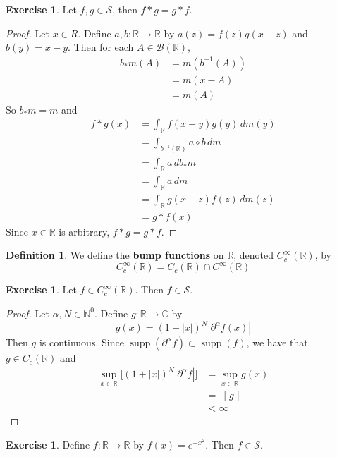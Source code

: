 \documentclass[12pt]{amsart}
\theoremstyle{definition}
\newtheorem{defn}[definition]{Definition}
\newtheorem{ex}[definition]{Exercise}
\DeclareMathOperator{\supp}{supp}
\newcommand{\p}{\partial}
\newcommand{\al}{\alpha}
\newcommand{\C}{\mathbb{C}}
\newcommand{\N}{\mathbb{N}}
\newcommand{\R}{\mathbb{R}}
\newcommand{\MB}{\mathcal{B}}
\newcommand{\MS}{\mathcal{S}}
\newcommand{\dm}{\, d m}
\begin{document}
	\begin{ex}
		Let $f, g \in \MS$, then $f*g = g*f$.
	\end{ex}

	\begin{proof}
		Let $x \in R$. Define $a,b:\R \rightarrow \R$ by $a(z) = f(z)g(x-z)$ and $b(y) = x-y$. Then for each $A \in \MB(\R)$, 
		\begin{align*}
			b_*m(A)
			& = m(b^{-1}(A)) \\
			& = m(x - A) \\
			& = m(A)
		\end{align*}
		So $b_*m = m$ and  
		\begin{align*}
			f*g(x)
			& = \int_{\R} f(x-y)g(y) \dm(y) \\
			& = \int_{b^{-1}(\R)} a \circ b \dm \\
			& = \int_{\R} a \, d b_*m \\
			& = \int_{\R} a \dm \\
			& = \int_{\R} g(x-z) f(z) \dm(z) \\
			& = g*f(x)
		\end{align*}
		Since $x \in \R$ is arbitrary, $f*g = g*f$.
	\end{proof}

	\begin{defn}
		We define the \textbf{bump functions} on $\R$, denoted $C_c^{\infty}(\R)$,  by $$C_c^{\infty}(\R) = C_c(\R) \cap C^{\infty}(\R)$$
	\end{defn}

	\begin{ex}
		Let $f \in C_c^{\infty}(\R)$. Then $f \in \MS$. 
	\end{ex}

	\begin{proof}
		Let $\al,N \in \N^0$. Define $g: \R \rightarrow \C$ by 
		$$g(x) = (1+|x|)^N |\p^{\al}f(x)|$$ 
		Then $g$ is continuous. Since $\supp(\p^{\al}f) \subset \supp(f)$, we have that $g \in C_c(\R)$ and
		\begin{align*}
			\sup_{x \in \R} \bigg[ (1+|x|)^N |\p^{\al}f|\bigg] 
			& = \sup_{x \in \R} g(x) \\
			& = \|g\| \\
			& < \infty
		\end{align*}
	\end{proof}

	\begin{ex}
		Define $f:\R \rightarrow \R$ by $f(x) = e^{-x^2}$. Then $f \in \MS$.
	\end{ex}
	
\end{document}

